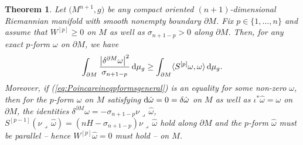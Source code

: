 \documentclass[pdftex]{sigma}
\numberwithin{equation}{section}
\newtheorem{Theorem}{Theorem}[section]
\begin{document}
\begin{Theorem}\label{t:Poincareineqpformsgeneral}
Let $\bigl(M^{n+1},g\bigr)$ be any compact oriented  $(n+1)$-dimensional Riemannian manifold with smooth nonempty boundary $\partial M$.
Fix $p\in\{1,\dots,n\}$ and assume that $W^{[p]}\geq0$ on $M$ as well as $\sigma_{n+1-p}>0$ along $\partial M$.
Then, for any exact $p$-form $\omega$ on $\partial M$,  we have
\begin{equation}\label{eq:Poincareineqpformsgeneral}
\int_{\partial M}\frac{\bigl|\delta^{\partial M}\omega\bigr|^2}{\sigma_{n+1-p}}\,{\rm d}\mu_g\geq\int_{\partial M}\langle S^{[p]}\omega,\omega\rangle\,{\rm d}\mu_g.
\end{equation}
Moreover, if {\rm (\ref{eq:Poincareineqpformsgeneral})} is an equality for some non-zero $\omega$, then for the $p$-form $\hat{\omega}$ on $M$ satisfying ${\rm d}\hat{\omega}=0=\delta\hat{\omega}$ on $M$ as well as $\iota^*\hat{\omega}=\omega$ on $\partial M$, the identities $\delta^{\partial M}\omega=-\sigma_{n+1-p}\nu\lrcorner\,\hat{\omega}$, $S^{[p-1]}(\nu\lrcorner\,\hat{\omega})=(nH-\sigma_{n+1-p})\nu\lrcorner\,\hat{\omega}$ hold along $\partial M$ and the $p$-form $\hat{\omega}$ must be parallel -- hence $W^{[p]}\hat{\omega}=0$ must hold -- on $M$.
\end{Theorem}
\end{document}
